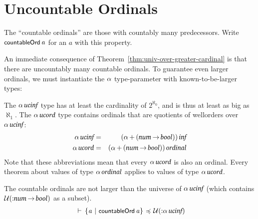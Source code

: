 \documentclass[11pt]{llncs}
\renewcommand{\HOLConst}[1]{{\textsf{\upshape\small #1}}}
\renewcommand{\HOLTyOp}[1]{\mbox{\fontencoding{T1}\fontfamily{bch}\fontseries{m}\fontshape{it}\fontsize{9.5}{10}\selectfont #1}}
\renewcommand{\HOLinline}[1]{\ensuremath{#1}}
\newenvironment{holmath}{\begin{displaymath}\begin{array}{l}}{\end{array}\end{displaymath}\ignorespacesafterend}
\begin{document}
\section{Uncountable Ordinals}
\label{sec:uncountable-ordinals}

\begin{definition}
The ``countable ordinals'' are those with countably many predecessors.
Write \HOLinline{\HOLConst{countableOrd}\,\HOLFreeVar{a}} for an $a$ with this property.
\end{definition}

An immediate consequence of Theorem~\ref{thm:univ-over-greater-cardinal} is that there are uncountably many countable ordinals.
To guarantee even larger ordinals, we must instantiate the \HOLinline{\HOLFreeVar{\ensuremath{\alpha}}} type-parameter with known-to-be-larger types:
\begin{definition}
\label{defn:uncord-tyabbrevs}
The \HOLinline{\ensuremath{\alpha}\,\HOLTyOp{ucinf}} type has at least the cardinality of $2^{\aleph_0}$, and is thus at least as big as $\aleph_1$.
The \HOLinline{\ensuremath{\alpha}\,\HOLTyOp{ucord}} type contains ordinals that are quotients of wellorders over \HOLinline{\ensuremath{\alpha}\,\HOLTyOp{ucinf}}:
\begin{eqnarray*}
\HOLinline{\ensuremath{\alpha}\,\HOLTyOp{ucinf}} &=& (\HOLinline{\ensuremath{\alpha}\,\ensuremath{{+}}\,(\HOLTyOp{num}\,\ensuremath{{\rightarrow}}\,\HOLTyOp{bool})})\,\HOLTyOp{inf}\\
\HOLinline{\ensuremath{\alpha}\,\HOLTyOp{ucord}} &=& (\HOLinline{\ensuremath{\alpha}\,\ensuremath{{+}}\,(\HOLTyOp{num}\,\ensuremath{{\rightarrow}}\,\HOLTyOp{bool})})\,\HOLTyOp{ordinal}
\end{eqnarray*}
Note that these abbreviations mean that every \HOLinline{\ensuremath{\alpha}\,\HOLTyOp{ucord}} is also an ordinal.
Every theorem about values of type \HOLinline{\ensuremath{\alpha}\,\HOLTyOp{ordinal}} applies to values of type \HOLinline{\ensuremath{\alpha}\,\HOLTyOp{ucord}}.
\end{definition}
\begin{lemma}
\label{lem:ucord-sup-exists}
The countable ordinals are not larger than the universe of \HOLinline{\ensuremath{\alpha}\,\HOLTyOp{ucinf}} (which contains \HOLinline{\ensuremath{\cal{U}}(\ensuremath{{:}}\HOLTyOp{num}\,\ensuremath{{\rightarrow}}\,\HOLTyOp{bool})} as a subset).
\begin{holmath}
\HOLTokenTurnstile{}\,\ensuremath{{\{}}\HOLBoundVar{a}\,\ensuremath{{\,\mid\,}}\,\HOLConst{countableOrd}\,\HOLBoundVar{a}\ensuremath{{\}}}\,\ensuremath{{\,\HOLTokenIsPrefix\,}}\,\ensuremath{\cal{U}}(\ensuremath{{:}}\ensuremath{\alpha}\,\HOLTyOp{ucinf})
\end{holmath}
\end{lemma}
\end{document}
